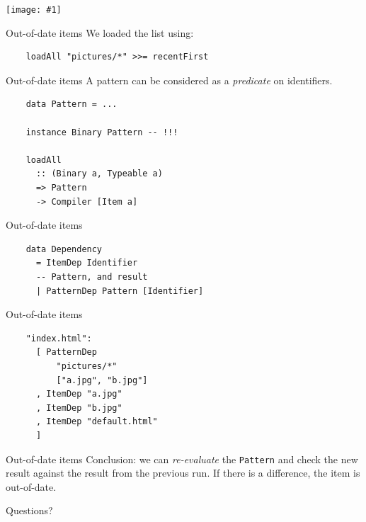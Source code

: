 \documentclass[20pt]{beamer}
\newcommand{\vspaced}{
    \vspace{5mm}
}
\newcommand{\imageframe}[1]{
    {
        \begin{frame}[plain]
        \begin{center}
        \texttt{[image: \#1]}
        \end{center}
        \end{frame}
    }
}
\newcommand{\chapterslide}[1]{
    {
        \begin{frame}[plain]
        \begin{center}
        \large{#1}
        \end{center}
        \end{frame}
    }
}
\newcommand{\code}[1]{
    \texttt{\small{#1}}
}
\begin{document}
\imageframe{{images/deps-04.dot}.pdf}

\begin{frame}[fragile]{Out-of-date items}
    We loaded the list using: \\
    \vspaced
    \begin{lstlisting}
    loadAll "pictures/*" >>= recentFirst
    \end{lstlisting}
\end{frame}

\begin{frame}[fragile]{Out-of-date items}
    A pattern can be considered as a \emph{predicate} on identifiers. \\
    \vspaced
    \begin{lstlisting}
    data Pattern = ...

    instance Binary Pattern -- !!!

    loadAll
      :: (Binary a, Typeable a)
      => Pattern
      -> Compiler [Item a]
    \end{lstlisting}
\end{frame}

\begin{frame}[fragile]{Out-of-date items}
    \begin{lstlisting}
    data Dependency
      = ItemDep Identifier
      -- Pattern, and result
      | PatternDep Pattern [Identifier]
    \end{lstlisting}
\end{frame}

\begin{frame}[fragile]{Out-of-date items}
    \begin{lstlisting}
    "index.html":
      [ PatternDep
          "pictures/*"
          ["a.jpg", "b.jpg"]
      , ItemDep "a.jpg"
      , ItemDep "b.jpg"
      , ItemDep "default.html"
      ]
    \end{lstlisting}
\end{frame}

\begin{frame}{Out-of-date items}
    Conclusion: we can \emph{re-evaluate} the \code{Pattern} and check the new
    result against the result from the previous run.  If there is a difference,
    the item is out-of-date.
\end{frame}

\chapterslide{Questions?}
\end{document}
